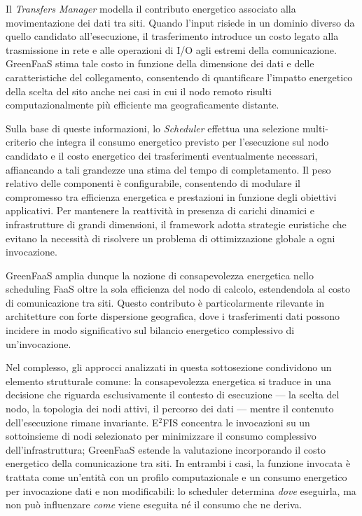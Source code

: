 Il \emph{Transfers Manager} modella il contributo energetico associato
alla movimentazione dei dati tra siti. Quando l'input risiede in un
dominio diverso da quello candidato all'esecuzione, il trasferimento
introduce un costo legato alla trasmissione in rete e alle operazioni
di I/O agli estremi della comunicazione. GreenFaaS stima tale costo in
funzione della dimensione dei dati e delle caratteristiche del
collegamento, consentendo di quantificare l'impatto energetico della
scelta del sito anche nei casi in cui il nodo remoto risulti
computazionalmente più efficiente ma geograficamente distante.

Sulla base di queste informazioni, lo \emph{Scheduler} effettua una
selezione multi-criterio che integra il consumo energetico previsto per
l'esecuzione sul nodo candidato e il costo energetico dei trasferimenti
eventualmente necessari, affiancando a tali grandezze una stima del
tempo di completamento. Il peso relativo delle componenti è
configurabile, consentendo di modulare il compromesso tra efficienza
energetica e prestazioni in funzione degli obiettivi applicativi. Per
mantenere la reattività in presenza di carichi dinamici e
infrastrutture di grandi dimensioni, il framework adotta strategie
euristiche che evitano la necessità di risolvere un problema di
ottimizzazione globale a ogni invocazione.

GreenFaaS amplia dunque la nozione di consapevolezza energetica nello
scheduling FaaS oltre la sola efficienza del nodo di calcolo,
estendendola al costo di comunicazione tra siti. Questo contributo è
particolarmente rilevante in architetture con forte dispersione
geografica, dove i trasferimenti dati possono incidere in modo
significativo sul bilancio energetico complessivo di un'invocazione.


\vspace{0.5em}

Nel complesso, gli approcci analizzati in questa sottosezione
condividono un elemento strutturale comune: la consapevolezza
energetica si traduce in una decisione che riguarda esclusivamente il
contesto di esecuzione --- la scelta del nodo, la topologia dei nodi
attivi, il percorso dei dati --- mentre il contenuto dell'esecuzione
rimane invariante. E$^{2}$FIS concentra le invocazioni su un
sottoinsieme di nodi selezionato per minimizzare il consumo complessivo
dell'infrastruttura; GreenFaaS estende la valutazione incorporando il
costo energetico della comunicazione tra siti. In entrambi i casi, la
funzione invocata è trattata come un'entità con un profilo
computazionale e un consumo energetico per invocazione dati e non
modificabili: lo scheduler determina \emph{dove} eseguirla, ma non può
influenzare \emph{come} viene eseguita né il consumo che ne deriva.

